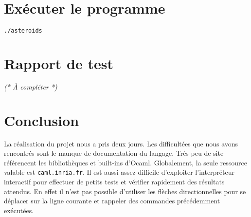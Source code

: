 \documentclass[a4paper,10pt,openany,oneside]{report}
\begin{document}
\section{Exécuter le programme}

\texttt{./asteroids}

\section{Rapport de test}

\textit{(* À compléter *)}

\section{Conclusion}

La réalisation du projet nous a pris deux jours. Les difficultées que nous
avons rencontrés sont le manque de documentation du langage. Très peu de site
référencent les bibliothèques et built-ins d'Ocaml. Globalement, la seule
ressource valable est \texttt{caml.inria.fr}. Il est aussi assez difficile
d'exploiter l'interpréteur interactif pour effectuer de petits tests et
vérifier rapidement des résultats attendus. En effet il n'est pas possible
d'utiliser les flèches directionnelles pour se déplacer sur la ligne courante
et rappeler des commandes précédemment exécutées.
\end{document}

